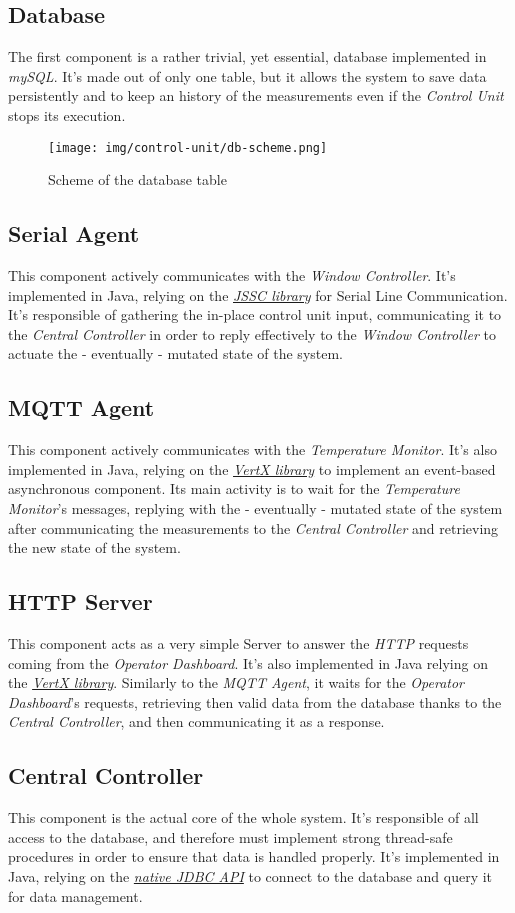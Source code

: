 \documentclass[a4paper,12pt]{report}
\begin{document}
		\subsection{Database}
		The first component is a rather trivial, yet essential, database implemented in \textit{mySQL}. It's made out of only one table, but it allows the system to save data persistently and to keep an history of the measurements even if the \textit{Control Unit} stops its execution.
		\begin{figure}[H]
			\centering{}
			\texttt{[image: img/control-unit/db-scheme.png]}
			\caption{Scheme of the database table}
			\label{img:control-unit/db-scheme}
		\end{figure}
		\subsection{Serial Agent}
		This component actively communicates with the \textit{Window Controller}. It's implemented in Java, relying on the \href{https://github.com/java-native/jssc}{\textit{JSSC library}} for Serial Line Communication. It's responsible of gathering the in-place control unit input, communicating it to the \textit{Central Controller} in order to reply effectively to the \textit{Window Controller} to actuate the - eventually - mutated state of the system.
		\subsection{MQTT Agent}
		This component actively communicates with the \textit{Temperature Monitor}. It's also implemented in Java, relying on the \href{https://vertx.io/}{\textit{VertX library}} to implement an event-based asynchronous component. Its main activity is to wait for the \textit{Temperature Monitor}'s messages, replying with the - eventually - mutated state of the system after communicating the measurements to the \textit{Central Controller} and retrieving the new state of the system.
		\subsection{HTTP Server}
		This component acts as a very simple Server to answer the \textit{HTTP} requests coming from the \textit{Operator Dashboard}. It's also implemented in Java relying on the \href{https://vertx.io/}{\textit{VertX library}}. Similarly to the \textit{MQTT Agent}, it waits for the \textit{Operator Dashboard}'s requests, retrieving then valid data from the database thanks to the \textit{Central Controller}, and then communicating it as a response.
		\subsection{Central Controller}
		This component is the actual core of the whole system. It's responsible of all access to the database, and therefore must implement strong thread-safe procedures in order to ensure that data is handled properly. It's implemented in Java, relying on the \href{https://docs.oracle.com/javase/8/docs/technotes/guides/jdbc/}{\textit{native JDBC API}} to connect to the database and query it for data management.
	
\end{document}
